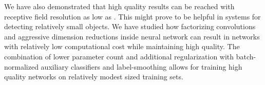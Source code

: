\documentclass[10pt,twocolumn,letterpaper]{article}
\begin{document}
We have also demonstrated that high quality results can be reached with
receptive field resolution as low as . This might prove
to be helpful in systems for detecting relatively small objects.
We have studied how factorizing convolutions and aggressive dimension
reductions inside neural network can result in networks with relatively
low computational cost while maintaining high quality.
The combination of lower parameter count and additional
regularization with batch-normalized auxiliary classifiers and
label-smoothing allows for training high quality networks on relatively
modest sized training sets.
 


{\small


}
\end{document}
